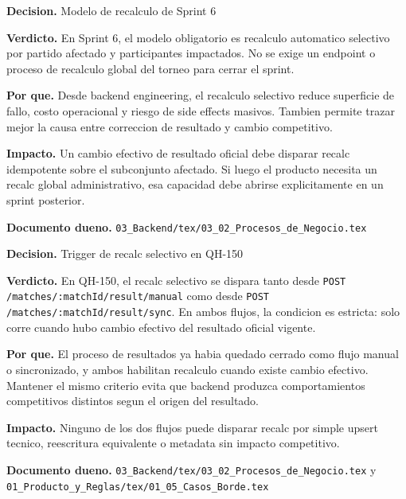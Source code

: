 \begin{docnote}
\textbf{Decision.} Modelo de recalculo de Sprint 6

\textbf{Verdicto.} En Sprint 6, el modelo obligatorio es recalculo automatico selectivo por partido afectado y participantes impactados. No se exige un endpoint o proceso de recalculo global del torneo para cerrar el sprint.

\textbf{Por que.} Desde backend engineering, el recalculo selectivo reduce superficie de fallo, costo operacional y riesgo de side effects masivos. Tambien permite trazar mejor la causa entre correccion de resultado y cambio competitivo.

\textbf{Impacto.} Un cambio efectivo de resultado oficial debe disparar recalc idempotente sobre el subconjunto afectado. Si luego el producto necesita un recalc global administrativo, esa capacidad debe abrirse explicitamente en un sprint posterior.

\textbf{Documento dueno.} \texttt{03\_Backend/tex/03\_02\_Procesos\_de\_Negocio.tex}
\end{docnote}

\begin{docnote}
\textbf{Decision.} Trigger de recalc selectivo en QH-150

\textbf{Verdicto.} En QH-150, el recalc selectivo se dispara tanto desde \texttt{POST /matches/:matchId/result/manual} como desde \texttt{POST /matches/:matchId/result/sync}. En ambos flujos, la condicion es estricta: solo corre cuando hubo cambio efectivo del resultado oficial vigente.

\textbf{Por que.} El proceso de resultados ya habia quedado cerrado como flujo manual o sincronizado, y ambos habilitan recalculo cuando existe cambio efectivo. Mantener el mismo criterio evita que backend produzca comportamientos competitivos distintos segun el origen del resultado.

\textbf{Impacto.} Ninguno de los dos flujos puede disparar recalc por simple upsert tecnico, reescritura equivalente o metadata sin impacto competitivo.

\textbf{Documento dueno.} \texttt{03\_Backend/tex/03\_02\_Procesos\_de\_Negocio.tex} y \texttt{01\_Producto\_y\_Reglas/tex/01\_05\_Casos\_Borde.tex}
\end{docnote}

